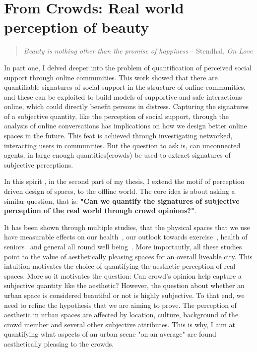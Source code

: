 \chapter{From Crowds: Real world perception of beauty}
\label{chap:quant_perception}


\graphicspath{{Chapter4/plots/} {Chapter4/plots/examples/} {Chapter4/plots/GAN_examples/}}
\begin{quote}
    \textsl{Beauty is nothing other than the promise of happiness}
    -- Stendhal, \textsl{On Love}
\end{quote}

In part one, I delved deeper into the problem of quantification of perceived social support through online communities. This work showed that there are quantifiable signatures of social support in the structure of online communities, and these can be exploited to build models of supportive and safe interactions online, which could directly benefit persons in distress. Capturing the signatures of a subjective quantity, like the perception of social support, through the analysis of online conversations has implications on how we design better online spaces in the future. This feat is achieved through investigating networked, interacting users in communities. But the question to ask is, can unconnected agents, in large enough quantities(crowds) be used to extract signatures of subjective perceptions. 
 
In this spirit , in the second part of my thesis, I extend the motif of perception driven design of spaces, to the offline world. The core idea is about asking a similar question, that is: \textbf{"Can we quantify the signatures of subjective perception of the real world through crowd opinions?"}. 

It has been shown through multiple studies, that the physical spaces that we use have measurable effects on our health~\cite{maas2006green,lee2011health}, our outlook towards exercise~\cite{tamosiunas2014accessibility}, health of seniors~\cite{takano2002urban} and general all round well being~\cite{gascon2015mental,nutsford2013ecological}. More importantly, all these studies point to the value of aesthetically pleasing spaces for an overall liveable city. This intuition motivates the choice of quantifying the aesthetic perception of real spaces. More so it motivates the question: Can crowd's opinion help capture a subjective quantity like the aesthetic? 
However, the question about whether an urban space is considered beautiful or not is highly subjective. To that end, we need to refine the hypothesis that we are aiming to prove. The perception of aesthetic in urban spaces are affected by location, culture, background of the crowd member and several other subjective attributes. This is why, I aim at quantifying what aspects of an urban scene "on an average" are found aesthetically pleasing to the crowds.

